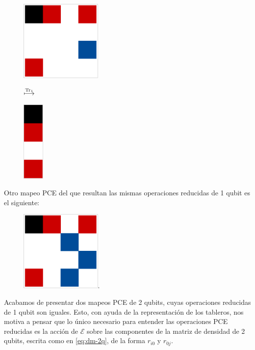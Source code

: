 \documentclass[11pt,dvipsnames]{article} %
\newcommand{\E}{\mathcal{E}}
\newcommand{\1}{\mathds{1}}
\begin{document}
\begin{figure}[H]
    \centering
    \begin{minipage}{.4\textwidth}
        \centering
        \includegraphics[height=4cm]{img/rndm-tab-2q-1}
    \end{minipage}
    $\stackrel{\Tr _1}{\longmapsto}$
    \begin{minipage}{0.4\textwidth}
        \centering
         \includegraphics[height=4cm]{img/rndm-tab-1q2-1}
         \hfill
    \end{minipage}
\end{figure}

Otro mapeo PCE del que resultan las mismas operaciones reducidas
de 1 qubit es el siguiente:
\begin{figure}[H]
  \centering
  \includegraphics[height=4cm]{img/rndm-tab-2q-2}.
\end{figure}
Acabamos de presentar dos mapeos PCE de 2 qubits, cuyas 
operaciones reducidas de 1 qubit son iguales. Esto, con ayuda 
de la representación de los tableros, nos motiva a pensar que 
lo único necesario para entender las operaciones PCE reducidas 
es la acción de $\E$ sobre las componentes de la matriz de densidad
de 2 qubits, escrita como en \eqref{eq:dm-2q}, 
de la forma $r_{i0}$ y $r_{0j}$.
\end{document}
